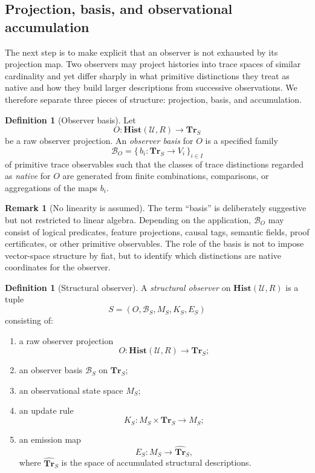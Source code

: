 \documentclass[11pt,twoside]{article}
\theoremstyle{definition}
\newtheorem{definition}[theorem]{Definition}
\newtheorem{remark}[theorem]{Remark}
\newcommand{\Hist}{\mathbf{Hist}}
\newcommand{\Tr}{\mathbf{Tr}}
\begin{document}
\subsection{Projection, basis, and observational accumulation}
\label{subsec:projection-basis-accumulation}

The next step is to make explicit that an observer is not exhausted by its projection map. Two observers may project histories into trace spaces of similar cardinality and yet differ sharply in what primitive distinctions they treat as native and how they build larger descriptions from successive observations. We therefore separate three pieces of structure: projection, basis, and accumulation.

\begin{definition}[Observer basis]
\label{def:observer-basis}
Let
\[
  O : \Hist(\mathcal{U},R)\to \Tr_S
\]
be a raw observer projection. An \emph{observer basis} for \(O\) is a specified family
\[
  \mathcal{B}_O = \{\, b_i : \Tr_S \to V_i \,\}_{i\in I}
\]
of primitive trace observables such that the classes of trace distinctions regarded as \emph{native} for \(O\) are generated from finite combinations, comparisons, or aggregations of the maps \(b_i\).
\end{definition}

\begin{remark}[No linearity is assumed]
\label{rem:no-linearity}
The term ``basis'' is deliberately suggestive but not restricted to linear algebra. Depending on the application, \(\mathcal{B}_O\) may consist of logical predicates, feature projections, causal tags, semantic fields, proof certificates, or other primitive observables. The role of the basis is not to impose vector-space structure by fiat, but to identify which distinctions are native coordinates for the observer.
\end{remark}

\begin{definition}[Structural observer]
\label{def:structural-observer}
A \emph{structural observer} on \(\Hist(\mathcal{U},R)\) is a tuple
\[
  S = (O,\mathcal{B}_S,M_S,K_S,E_S)
\]
consisting of:
\begin{enumerate}[leftmargin=*]
  \item a raw observer projection
        \[
          O : \Hist(\mathcal{U},R)\to \Tr_S;
        \]
  \item an observer basis \(\mathcal{B}_S\) on \(\Tr_S\);
  \item an observational state space \(M_S\);
  \item an update rule
        \[
          K_S : M_S \times \Tr_S \to M_S;
        \]
  \item an emission map
        \[
          E_S : M_S \to \widehat{\Tr}_S,
        \]
        where \(\widehat{\Tr}_S\) is the space of accumulated structural descriptions.
\end{enumerate}
\end{definition}
\end{document}
